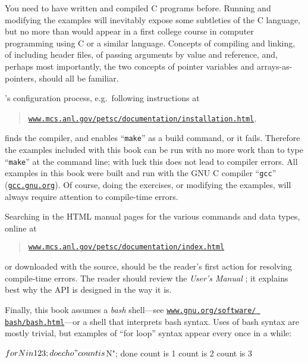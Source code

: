 You need to have written and compiled C programs before.   Running and modifying the examples will inevitably expose some subtleties of the C language, but no more than would appear in a first college course in computer programming using C or a similar language.  Concepts of compiling and linking, of including header files, of passing arguments by value and reference, and, perhaps most importantly, the two concepts of pointer variables and arrays-as-pointers, should all be familiar.

\PETSc's configuration process, e.g.~following instructions at
\begin{quote}
\href{http://www.mcs.anl.gov/petsc/documentation/installation.html}{\texttt{www.mcs.anl.gov/petsc/documentation/installation.html}},
\end{quote}
finds the compiler, and enables ``\texttt{make}'' as a build command, or it fails.  Therefore the examples included with this book can be run with no more work than to type ``\texttt{make}'' at the command line; with luck this does not lead to compiler errors.  All examples in this book were built and run with the GNU C compiler ``\texttt{gcc}'' (\href{https://gcc.gnu.org/}{\texttt{gcc.gnu.org}}).  Of course, doing the exercises, or modifying the examples, will always require attention to compile-time errors.

Searching in the \PETSc HTML manual pages for the various commands and data types, online at
\begin{quote}
\href{http://www.mcs.anl.gov/petsc/documentation/index.html}{\texttt{www.mcs.anl.gov/petsc/documentation/index.html}}
\end{quote}
or downloaded with the \PETSc source, should be the reader's first action for resolving compile-time errors.  The reader should review the \emph{\PETSc User's Manual} \citep{petsc-user-ref}; it explains best why the API is designed in the way it is.

Finally, this book assumes a \emph{bash} shell---see  \href{https://www.gnu.org/software/bash/bash.html}{\texttt{www.gnu.org/software/ bash/bash.html}}---or a shell that interprets bash syntax.  Uses of bash syntax are mostly trivial, but examples of ``for loop'' syntax appear every once in a while:
\begin{cline}
$ for N in 1 2 3; do echo "count is $N"; done
count is 1
count is 2
count is 3
\end{cline}
